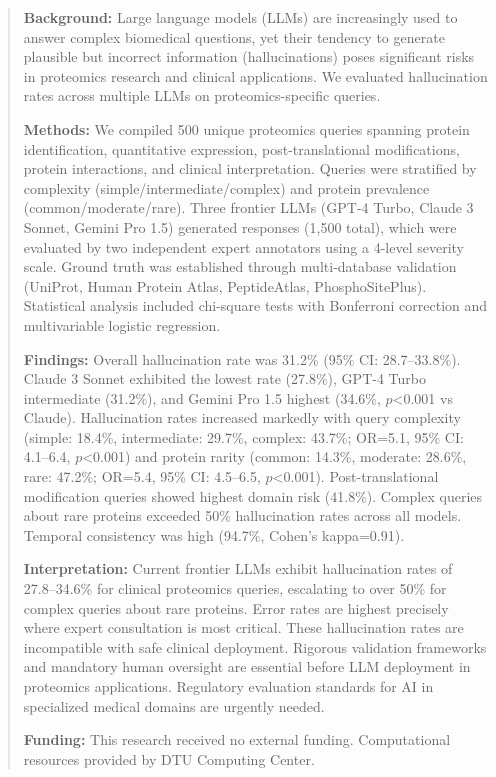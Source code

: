 
\begin{abstract}

\textbf{Background:}
Large language models (LLMs) are increasingly used to answer complex biomedical questions, yet their tendency to generate plausible but incorrect information (hallucinations) poses significant risks in proteomics research and clinical applications. We evaluated hallucination rates across multiple LLMs on proteomics-specific queries.

\textbf{Methods:}
We compiled 500 unique proteomics queries spanning protein identification, quantitative expression, post-translational modifications, protein interactions, and clinical interpretation. Queries were stratified by complexity (simple/intermediate/complex) and protein prevalence (common/moderate/rare). Three frontier LLMs (GPT-4 Turbo, Claude 3 Sonnet, Gemini Pro 1.5) generated responses (1,500 total), which were evaluated by two independent expert annotators using a 4-level severity scale. Ground truth was established through multi-database validation (UniProt, Human Protein Atlas, PeptideAtlas, PhosphoSitePlus). Statistical analysis included chi-square tests with Bonferroni correction and multivariable logistic regression.

\textbf{Findings:}
Overall hallucination rate was 31.2\% (95\% CI: 28.7--33.8\%). Claude 3 Sonnet exhibited the lowest rate (27.8\%), GPT-4 Turbo intermediate (31.2\%), and Gemini Pro 1.5 highest (34.6\%, $p$<0.001 vs Claude). Hallucination rates increased markedly with query complexity (simple: 18.4\%, intermediate: 29.7\%, complex: 43.7\%; OR=5.1, 95\% CI: 4.1--6.4, $p$<0.001) and protein rarity (common: 14.3\%, moderate: 28.6\%, rare: 47.2\%; OR=5.4, 95\% CI: 4.5--6.5, $p$<0.001). Post-translational modification queries showed highest domain risk (41.8\%). Complex queries about rare proteins exceeded 50\% hallucination rates across all models. Temporal consistency was high (94.7\%, Cohen's kappa=0.91).

\textbf{Interpretation:}
Current frontier LLMs exhibit hallucination rates of 27.8--34.6\% for clinical proteomics queries, escalating to over 50\% for complex queries about rare proteins. Error rates are highest precisely where expert consultation is most critical. These hallucination rates are incompatible with safe clinical deployment. Rigorous validation frameworks and mandatory human oversight are essential before LLM deployment in proteomics applications. Regulatory evaluation standards for AI in specialized medical domains are urgently needed.

\textbf{Funding:}
This research received no external funding. Computational resources provided by DTU Computing Center.

\end{abstract}

